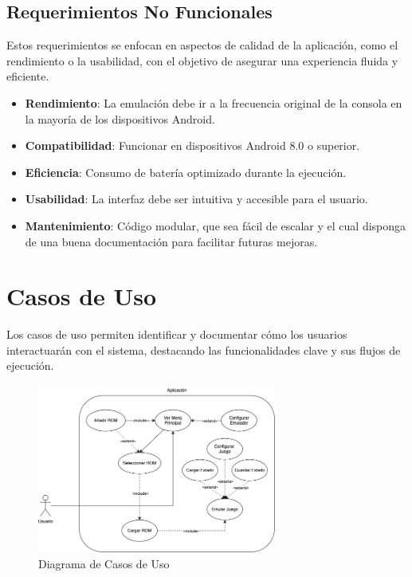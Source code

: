 \subsection{Requerimientos No Funcionales}

Estos requerimientos se enfocan en aspectos de calidad de la aplicación, como el rendimiento o la usabilidad, con el objetivo de asegurar una experiencia fluida y eficiente.

\begin{itemize}
    \item \textbf{Rendimiento}: La emulación debe ir a la frecuencia original de la consola en la mayoría de los dispositivos Android.
    \item \textbf{Compatibilidad}: Funcionar en dispositivos Android 8.0 o superior.
    \item \textbf{Eficiencia}: Consumo de batería optimizado durante la ejecución.
    \item \textbf{Usabilidad}: La interfaz debe ser intuitiva y accesible para el usuario.
    \item \textbf{Mantenimiento}: Código modular, que sea fácil de escalar y el cual disponga de una buena documentación para facilitar futuras mejoras.
\end{itemize}

\section{Casos de Uso}

Los casos de uso permiten identificar y documentar cómo los usuarios interactuarán con el sistema, destacando las funcionalidades clave y sus flujos de ejecución.

\begin{figure}[H]
    \centering
    \includegraphics[width=0.7\textwidth]{include/images/casosuso.png}
    \caption{Diagrama de Casos de Uso}
    \label{figure:usecases}
\end{figure}

